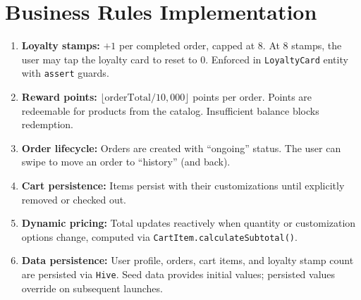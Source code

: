 \section{Business Rules Implementation}

\begin{enumerate}
  \item \textbf{Loyalty stamps:} $+1$ per completed order, capped at 8. At 8 stamps, the user may tap the loyalty card to reset to 0. Enforced in \texttt{LoyaltyCard} entity with \texttt{assert} guards.

  \item \textbf{Reward points:} $\lfloor \text{orderTotal} / 10{,}000 \rfloor$ points per order. Points are redeemable for products from the catalog. Insufficient balance blocks redemption.

  \item \textbf{Order lifecycle:} Orders are created with ``ongoing'' status. The user can swipe to move an order to ``history'' (and back).

  \item \textbf{Cart persistence:} Items persist with their customizations until explicitly removed or checked out.

  \item \textbf{Dynamic pricing:} Total updates reactively when quantity or customization options change, computed via \texttt{CartItem.calculateSubtotal()}.

  \item \textbf{Data persistence:} User profile, orders, cart items, and loyalty stamp count are persisted via \texttt{Hive}. Seed data provides initial values; persisted values override on subsequent launches.
\end{enumerate}
